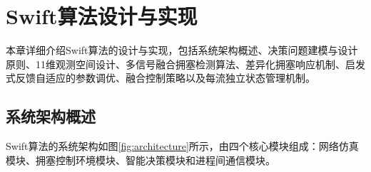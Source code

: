 \chapter{Swift算法设计与实现}\label{Chap:chap3}

本章详细介绍Swift算法的设计与实现，包括系统架构概述、决策问题建模与设计原则、11维观测空间设计、多信号融合拥塞检测算法、差异化拥塞响应机制、启发式反馈自适应的参数调优、融合控制策略以及每流独立状态管理机制。

\section{系统架构概述}

Swift算法的系统架构如图\ref{fig:architecture}所示，由四个核心模块组成：网络仿真模块、拥塞控制环境模块、智能决策模块和进程间通信模块。

